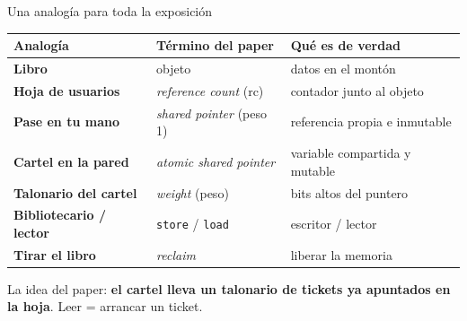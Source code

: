 \documentclass[aspectratio=169,11pt]{beamer}
\newcommand{\clave}[1]{\textcolor{acento}{\textbf{#1}}}
\begin{document}
\begin{frame}{Una analogía para toda la exposición}
  \renewcommand{\arraystretch}{1.1}\small
  \begin{tabularx}{\linewidth}{@{}>{\bfseries}p{4.2cm} p{4.6cm} X@{}}
    \toprule
    Analogía & Término del paper & Qué es de verdad\\
    \midrule
    Libro & objeto & datos en el montón\\
    \textcolor{hoja}{Hoja} de usuarios & \emph{reference count} (rc) & contador junto al objeto\\
    Pase en tu mano & \emph{shared pointer} (peso 1) & referencia propia e inmutable\\
    \textcolor{acento}{Cartel} en la pared & \emph{atomic shared pointer} & variable compartida y mutable\\
    \textcolor{acento}{Talonario} del cartel & \emph{weight} (peso) & bits altos del puntero\\
    Bibliotecario / lector & \texttt{store} / \texttt{load} & escritor / lector\\
    Tirar el libro & \emph{reclaim} & liberar la memoria\\
    \bottomrule
  \end{tabularx}
  \vfill
  \begin{center}\small La idea del paper: \clave{el cartel lleva un talonario de tickets ya apuntados en la hoja}. Leer = arrancar un ticket.\end{center}
\end{frame}
\end{document}
